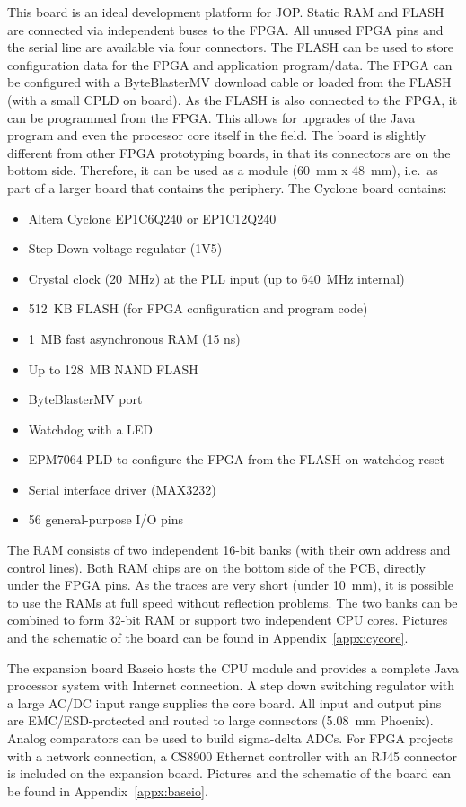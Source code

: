 This board is an ideal development platform for JOP. Static RAM and
FLASH are connected via independent buses to the FPGA. All unused
FPGA pins and the serial line are available via four connectors. The
FLASH can be used to store configuration data for the FPGA and
application program/data. The FPGA can be configured with a
ByteBlasterMV download cable or loaded from the FLASH (with a small
CPLD on board). As the FLASH is also connected to the FPGA, it can be
programmed from the FPGA. This allows for upgrades of the Java
program and even the processor core itself in the field. The board is
slightly different from other FPGA prototyping boards, in that its
connectors are on the bottom side. Therefore, it can be used as a
module (60~mm x 48~mm), i.e.\ as part of a larger board that contains
the periphery. The Cyclone board contains:
%
\begin{itemize}
\item Altera Cyclone EP1C6Q240 or EP1C12Q240
\item Step Down voltage regulator (1V5)
\item Crystal clock (20~MHz) at the PLL input (up to 640~MHz
    internal)
\item 512~KB FLASH (for FPGA configuration and program code)
\item 1~MB fast asynchronous RAM (15 ns)
\item Up to 128~MB NAND FLASH
\item ByteBlasterMV port
\item Watchdog with a LED
\item EPM7064 PLD to configure the FPGA from the FLASH on watchdog reset
\item Serial interface driver (MAX3232)
\item 56 general-purpose I/O pins
\end{itemize}
%
The RAM consists of two independent 16-bit banks (with their own
address and control lines). Both RAM chips are on the bottom side of
the PCB, directly under the FPGA pins. As the traces are very short
(under 10~mm), it is possible to use the RAMs at full speed without
reflection problems. The two banks can be combined to form 32-bit
RAM or support two independent CPU cores. Pictures and the schematic
of the board can be found in Appendix~\ref{appx:cycore}.


The expansion board Baseio hosts the CPU module and provides a
complete Java processor system with Internet connection. A step down
switching regulator with a large AC/DC input range supplies the core
board. All input and output pins are EMC/ESD-protected and routed to
large connectors (5.08~mm Phoenix). Analog comparators can be used to
build sigma-delta ADCs. For FPGA projects with a network connection,
a CS8900 Ethernet controller with an RJ45 connector is included on
the expansion board. Pictures and the schematic of the board can be
found in Appendix~\ref{appx:baseio}.


